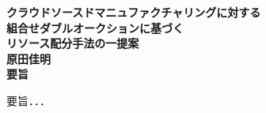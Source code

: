 \newpage
\thispagestyle{empty}
\begin{center}
	\mbox{\LARGE{\bf{クラウドソースドマニュファクチャリングに対する}}} \\
	\mbox{\LARGE{\bf{組合せダブルオークションに基づく}}} \\
	\mbox{\LARGE{\bf{リソース配分手法の一提案}}} \\
	\vspace*{2mm}
	\mbox{\Large{\bf{原田佳明}}}\\
	\vspace*{7mm}
	{\LARGE\bf 要旨}
\end{center}\par
要旨．．．